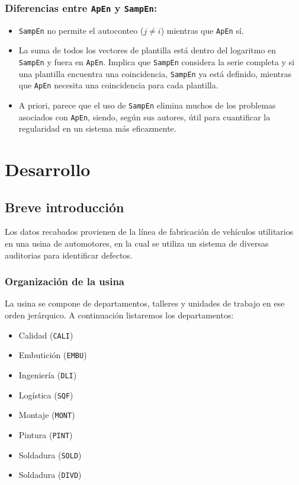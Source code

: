 \documentclass[a4paper,12pt]{article}
\begin{document}
\subsubsection{Diferencias entre \texttt{ApEn} y \texttt{SampEn}:}
\begin{itemize}
	\item \texttt{SampEn} no permite el autoconteo ($j \neq i$) mientras que \texttt{ApEn} sí. 
	\item La suma de todos los vectores de plantilla está dentro del logaritmo en \texttt{SampEn} y fuera en \texttt{ApEn}. Implica que \texttt{SampEn} considera la serie completa y si una plantilla encuentra una coincidencia, \texttt{SampEn} ya está definido, mientras que \texttt{ApEn} necesita una coincidencia para cada plantilla. 
	\item A priori, parece que el uso de \texttt{SampEn} elimina muchos de los problemas asociados con \texttt{ApEn}, siendo, según sus autores, útil para cuantificar la regularidad en un sistema más eficazmente.
\end{itemize}

\section{Desarrollo}

\subsection{Breve introducción}
Los datos recabados provienen de la línea de fabricación de vehículos utilitarios en una usina de automotores, en la cual se utiliza un sistema de diversas auditorias para identificar defectos.

\subsubsection{Organización de la usina}
La usina se compone de departamentos, talleres y unidades de trabajo en ese orden jerárquico. A continuación listaremos los departamentos:

\begin{itemize}
	\item Calidad (\texttt{CALI})
	\item Embutición (\texttt{EMBU})
	\item Ingeniería (\texttt{DLI})
	\item Logística (\texttt{SQF})
	\item Montaje (\texttt{MONT})
	\item Pintura (\texttt{PINT})
	\item Soldadura (\texttt{SOLD})
	\item Soldadura (\texttt{DIVD})
\end{itemize}
\end{document}
